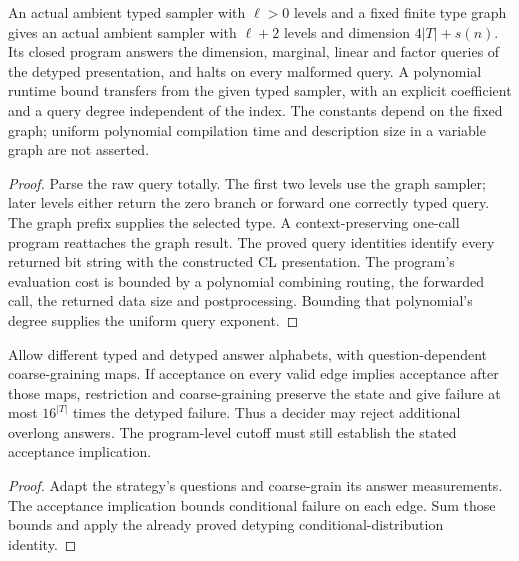\begin{lemma}
\label{lem:detype-functional-sampler}
\leanok
An actual ambient typed sampler with $\ell>0$ levels and a fixed finite type
graph gives an actual ambient sampler with $\ell+2$ levels and dimension
$4|T|+s(n)$. Its closed program answers the dimension, marginal, linear and
factor queries of the detyped presentation, and halts on every malformed
query. A polynomial runtime bound transfers from the given typed sampler,
with an explicit coefficient and a query degree independent of the index.
The constants depend on the fixed graph; uniform polynomial compilation time
and description size in a variable graph are not asserted.
\end{lemma}
\begin{proof}
\leanok
Parse the raw query totally. The first two levels use the graph sampler;
later levels either return the zero branch or forward one correctly typed
query. The graph prefix supplies the selected type. A context-preserving
one-call program reattaches the graph result. The proved query identities
identify every returned bit string with the constructed CL presentation.
The program's evaluation cost is bounded by a polynomial combining routing,
the forwarded call, the returned data size and postprocessing. Bounding that
polynomial's degree supplies the uniform query exponent.
\end{proof}

\begin{lemma}
\label{lem:detype-game-answers}
\leanok
Allow different typed and detyped answer alphabets, with question-dependent
coarse-graining maps. If acceptance on every valid edge implies acceptance
after those maps, restriction and coarse-graining preserve the state and give
failure at most $16^{|T|}$ times the detyped failure. Thus a decider may reject
additional overlong answers. The program-level cutoff must still establish
the stated acceptance implication.
\end{lemma}
\begin{proof}
\leanok
Adapt the strategy's questions and coarse-grain its answer measurements.
The acceptance implication bounds conditional failure on each edge. Sum those
bounds and apply the already proved detyping conditional-distribution identity.
\end{proof}

